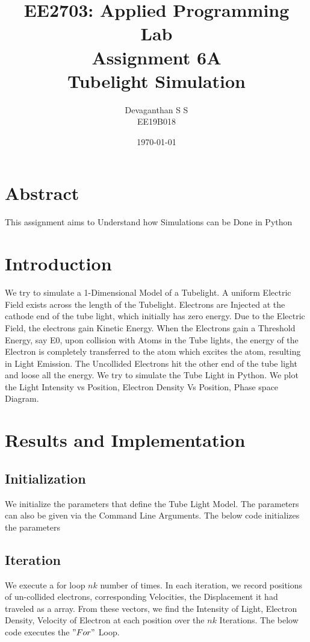 \documentclass[12pt, a4paper]{report}
\title{\textbf{EE2703: Applied Programming Lab\\Assignment 6A\\Tubelight Simulation
}}
\author{Devaganthan S S\\ EE19B018}
\date{\today}
\begin{document}
\maketitle


\section{Abstract}
This assignment aims to Understand how Simulations can be Done in Python


\section{Introduction}
We try to simulate a 1-Dimensional Model of a Tubelight. A uniform Electric Field exists across the length of the Tubelight. Electrons are Injected at the cathode end of the tube light, which initially has zero energy. Due to the Electric Field, the electrons gain Kinetic Energy. When the Electrons gain a Threshold Energy, say E0, upon collision with Atoms in the Tube lights, the energy of the Electron is completely transferred to the atom which excites the atom, resulting in Light Emission. The Uncollided Electrons hit the other end of the tube light and loose all the energy. We try to simulate the Tube Light in Python. We plot the Light Intensity vs Position, Electron Density Vs Position, Phase space Diagram.
\section{Results and Implementation}
\subsection{Initialization}
We initialize the parameters that define the Tube Light Model. The parameters can also be given via the Command Line Arguments. The below code initializes the parameters
\noindent

\subsection{Iteration}
We execute a for loop $nk$ number of times. In each iteration, we record positions of un-collided electrons, corresponding Velocities, the Displacement it had traveled as a array. From these vectors, we find the Intensity of Light, Electron Density, Velocity of Electron at each position over the $nk$ Iterations. The below code executes the $"For"$ Loop.
\end{document}
